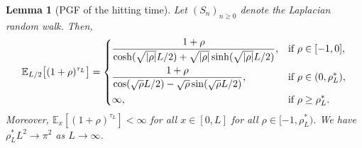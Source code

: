 \documentclass[a4paper, a4wide, 10pt, reqno]{amsart}
\theoremstyle{plain}
\newtheorem{lemma}[theorem]{Lemma}
\theoremstyle{definition}
\numberwithin{equation}{section}
\newcommand{\E}{\mathbb E}
\begin{document}
\begin{lemma}[PGF of the hitting time]\label{lem:pgf}
    Let $(S_n)_{n\ge 0}$ denote the Laplacian random walk. Then,
    \begin{equation}
        \E_{L/2}\big[(1+\rho)^{\tau_L}\big] =\begin{dcases}
            \frac{1+\rho}{\cosh(\sqrt{|\rho|}L/2)+\sqrt{|\rho|}\sinh({\sqrt{|\rho|}L/2})},&\text{if }\rho\in[-1,0],\\
             \frac{1+\rho}{\cos(\sqrt{\rho}L/2)-\sqrt{\rho}\sin({\sqrt{\rho}L/2)}},&\text{if }\rho\in(0,\rho_L^*),\\
             \infty,&\text{if }\rho\ge \rho_L^*.
        \end{dcases}
    \end{equation}
    Moreover, $\E_x[(1+\rho)^{\tau_L}]<\infty$ for all $x\in[0,L]$ for all $\rho\in[-1,\rho_L^*)$. We have 
    $\rho_L^*L^2\to\pi^2$ as $L\to\infty$.
\end{lemma} 
\end{document}
